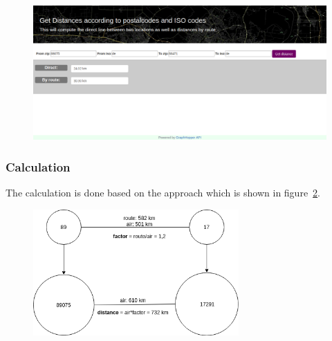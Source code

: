 \begin{figure}[H]
\hspace{-2.0cm}
\includegraphics[width=1.3\textwidth]{img/webapp}
\label{fig:webapp}
\end{figure}

\subsubsection{Calculation}

The calculation is done based on the approach which is shown in figure~\ref{fig:calc}.
\begin{figure}[H]
\centering
\includegraphics[width=0.7\textwidth]{img/calc}
\label{fig:calc}
\end{figure}
